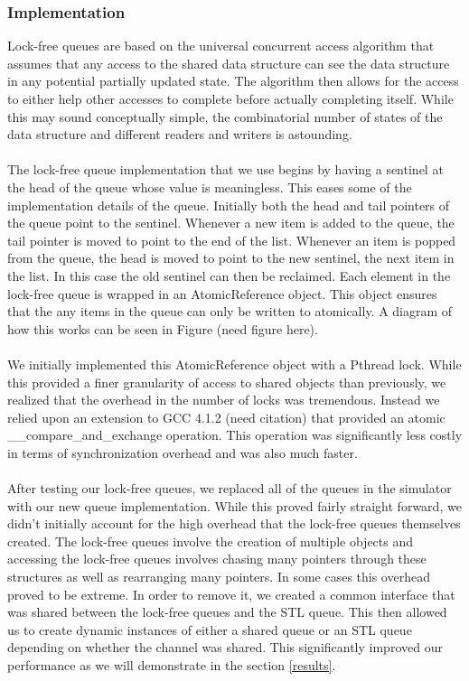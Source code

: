\documentclass{article}
\begin{document}
\begin{multicols}{2}
\subsubsection{Implementation}
Lock-free queues are based on the universal concurrent access algorithm
\cite{LF} that assumes that any access to the shared data structure can
see the data structure in any potential partially updated state.  The
algorithm then allows for the access to either help other accesses to
complete before actually completing itself.  While this may sound
conceptually simple, the combinatorial number of states of the data
structure and different readers and writers is astounding.\\
~\\
The lock-free queue implementation that we use begins by having a sentinel
at the head of the queue whose value is meaningless.  This eases some of
the implementation details of the queue.  Initially both the head and tail
pointers of the queue point to the sentinel.  Whenever a new item is added
to the queue, the tail pointer is moved to point to the end of the list.
Whenever an item is popped from the queue, the head is moved to point to
the new sentinel, the next item in the list.  In this case the old
sentinel can then be reclaimed.  Each element in the lock-free queue is
wrapped in an AtomicReference object.  This object ensures that the any
items in the queue can only be written to atomically.  A diagram of how
this works can be seen in Figure (need figure here).\\
~\\
We initially implemented this AtomicReference object with a Pthread
lock.  While this provided a finer granularity of access to shared
objects than previously, we realized that the overhead in the number of
locks was tremendous.  Instead we relied upon an extension to GCC 4.1.2
(need citation) that provided an atomic \_\_compare\_and\_exchange operation.
This operation was significantly less costly in terms of synchronization
overhead and was also much faster.\\
~\\
After testing our lock-free queues, we replaced all of
the queues in the simulator with our new queue implementation.  While this
proved fairly straight forward, we didn't initially account for the high
overhead that the lock-free queues themselves created.  The lock-free
queues involve the creation of multiple objects and accessing the
lock-free queues involves chasing many pointers through these structures
as well as rearranging many pointers.  In some cases this overhead proved
to be extreme.  In order to remove it, we created a common interface that
was shared between the lock-free queues and the STL queue.  This then
allowed us to create dynamic instances of either a shared queue or an STL
queue depending on whether the channel was shared.  This significantly
improved our performance as we will demonstrate in the section \ref{results}.


\end{multicols}
\end{document}
